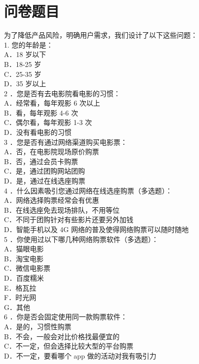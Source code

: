 \documentclass[a4paper]{article}
\begin{document}
\section{问卷题目}
为了降低产品风险，明确用户需求，我们设计了以下这些问题：\\[10pt]
\def\ind{\indent }
1. 您的年龄是：\\
\ind A．18 岁以下\\
\ind B．18-25 岁\\
\ind C．25-35 岁\\
\ind D．35 岁以上\\[7pt]
2 ．您是否有去电影院看电影的习惯： \\
\ind A．经常看，每年观影 6 次以上\\
\ind B．看，每年观影 4-6 次\\
\ind C．偶尔看，每年观影 1-3 次\\
\ind D．没有看电影的习惯\\[7pt]
3 ．您是否有通过网络渠道购买电影票：\\
\ind A．否，在电影院现场原价购票\\
\ind B．否，通过会员卡购票\\
\ind C．是，通过团购网站团购\\
\ind D．是，通过在线选座购票\\[7pt]
4 ．什么因素吸引您通过网络在线选座购票（多选题）：\\
\ind A．网络选择购票经常会有优惠\\
\ind B．在线选座免去现场排队，不用等位\\
\ind C．不同于团购针对有些影片还要另外加钱\\
\ind D．智能手机以及 4G 网络的普及使得网络购票可以随时随地\\[7pt]
5 ．你使用过以下哪几种网络购票软件（多选题）：\\
\ind A．猫眼电影\\
\ind B．淘宝电影\\
\ind C．微信电影票\\
\ind D．百度糯米\\
\ind E．格瓦拉\\
\ind F．时光网\\
\ind G．其他\\[7pt]
6 ．你是否会固定使用同一款购票软件：\\
\ind A．是的，习惯性购票\\
\ind B．不会，一般会对比价格找最便宜的\\
\ind C．不一定，但会选择比较大型的平台购票\\
\ind D．不一定，要看哪个 app 做的活动对我有吸引力\\[7pt]
\end{document}
